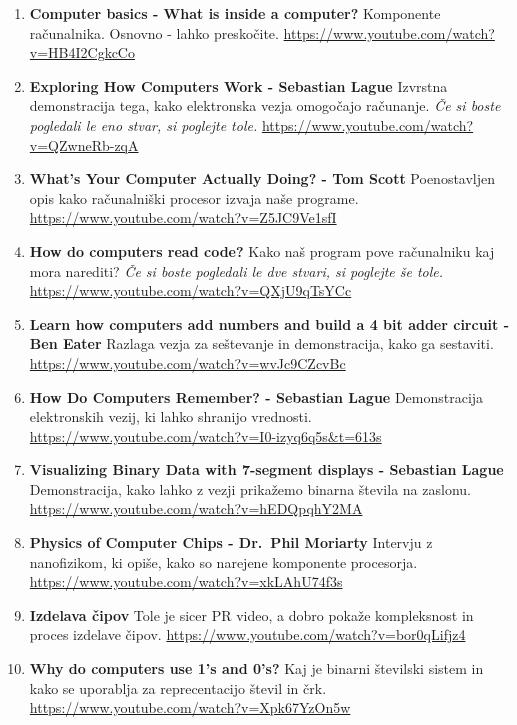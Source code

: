 \documentclass[
]{report}
\begin{document}
\begin{enumerate}
\def\labelenumi{\arabic{enumi}.}
\item
  \textbf{Computer basics - What is inside a computer?} Komponente računalnika. Osnovno - lahko preskočite. \url{https://www.youtube.com/watch?v=HB4I2CgkcCo}
\item
  \textbf{Exploring How Computers Work - Sebastian Lague} Izvrstna demonstracija tega, kako elektronska vezja omogočajo računanje. \emph{Če si boste pogledali le eno stvar, si poglejte tole.} \url{https://www.youtube.com/watch?v=QZwneRb-zqA}
\item
  \textbf{What's Your Computer Actually Doing? - Tom Scott} Poenostavljen opis kako računalniški procesor izvaja naše programe. \url{https://www.youtube.com/watch?v=Z5JC9Ve1sfI}
\item
  \textbf{How do computers read code?} Kako naš program pove računalniku kaj mora narediti? \emph{Če si boste pogledali le dve stvari, si poglejte še tole.} \url{https://www.youtube.com/watch?v=QXjU9qTsYCc}
\item
  \textbf{Learn how computers add numbers and build a 4 bit adder circuit - Ben Eater} Razlaga vezja za seštevanje in demonstracija, kako ga sestaviti. \url{https://www.youtube.com/watch?v=wvJc9CZcvBc}
\item
  \textbf{How Do Computers Remember? - Sebastian Lague} Demonstracija elektronskih vezij, ki lahko shranijo vrednosti. \url{https://www.youtube.com/watch?v=I0-izyq6q5s\&t=613s}
\item
  \textbf{Visualizing Binary Data with 7-segment displays - Sebastian Lague} Demonstracija, kako lahko z vezji prikažemo binarna števila na zaslonu. \url{https://www.youtube.com/watch?v=hEDQpqhY2MA}
\item
  \textbf{Physics of Computer Chips - Dr.~Phil Moriarty} Intervju z nanofizikom, ki opiše, kako so narejene komponente procesorja. \url{https://www.youtube.com/watch?v=xkLAhU74f3s}
\item
  \textbf{Izdelava čipov} Tole je sicer PR video, a dobro pokaže kompleksnost in proces izdelave čipov. \url{https://www.youtube.com/watch?v=bor0qLifjz4}
\item
  \textbf{Why do computers use 1's and 0's?} Kaj je binarni številski sistem in kako se uporablja za reprecentacijo števil in črk. \url{https://www.youtube.com/watch?v=Xpk67YzOn5w}
\end{enumerate}
\end{document}
